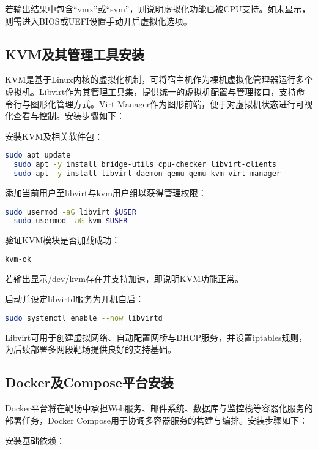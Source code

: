 \documentclass[lang=cn,10pt]{elegantbook}
\begin{document}
若输出结果中包含“vmx”或“svm”，则说明虚拟化功能已被CPU支持。如未显示，则需进入BIOS或UEFI设置手动开启虚拟化选项。

\subsection{KVM及其管理工具安装}

KVM是基于Linux内核的虚拟化机制，可将宿主机作为裸机虚拟化管理器运行多个虚拟机。Libvirt作为其管理工具集，提供统一的虚拟机配置与管理接口，支持命令行与图形化管理方式。Virt-Manager作为图形前端，便于对虚拟机状态进行可视化查看与控制。安装步骤如下：

安装KVM及相关软件包：

\begin{lstlisting}[language=bash]
  sudo apt update
  sudo apt -y install bridge-utils cpu-checker libvirt-clients 
  sudo apt -y install libvirt-daemon qemu qemu-kvm virt-manager
\end{lstlisting}

添加当前用户至libvirt与kvm用户组以获得管理权限：

\begin{lstlisting}[language=bash]
  sudo usermod -aG libvirt $USER
  sudo usermod -aG kvm $USER
\end{lstlisting}

验证KVM模块是否加载成功：

\begin{lstlisting}[language=bash]
  kvm-ok
\end{lstlisting}

若输出显示/dev/kvm存在并支持加速，即说明KVM功能正常。

启动并设定libvirtd服务为开机自启：

\begin{lstlisting}[language=bash]
  sudo systemctl enable --now libvirtd
\end{lstlisting}

Libvirt可用于创建虚拟网络、自动配置网桥与DHCP服务，并设置iptables规则，为后续部署多网段靶场提供良好的支持基础。

\subsection{Docker及Compose平台安装}

Docker平台将在靶场中承担Web服务、邮件系统、数据库与监控栈等容器化服务的部署任务，Docker Compose用于协调多容器服务的构建与编排。安装步骤如下：

安装基础依赖：
\end{document}
